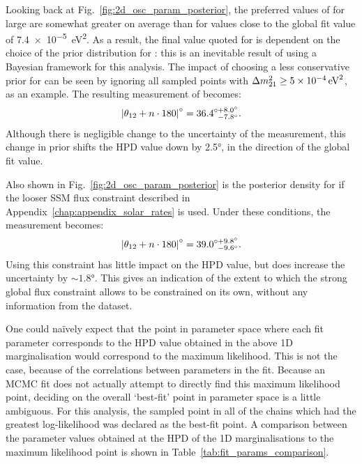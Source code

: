 Looking back at Fig.~\ref{fig:2d_osc_param_posterior}, the preferred values of \tonetwo{} for large \dmsq{} are somewhat greater on average than for \dmsq{} values close to the global fit value of \SI{7.4e-5}{\eV\squared}. As a result, the final value quoted for \tonetwo{} is dependent on the choice of the prior distribution for \dmsq{}: this is an inevitable result of using a Bayesian framework for this analysis. The impact of choosing a less conservative prior for \dmsq{} can be seen by ignoring all sampled points with $\dmsq{} \geq \SI{5e-4}{\eV\squared}$, as an example. The resulting measurement of \tonetwo{} becomes:
\begin{equation*}
    \left|\theta_{12}{} + n\cdot180\right|^{\circ} = 36.4^{\circ+8.0^{\circ}}_{\phantom{\circ}-7.8^{\circ}}.
\end{equation*}
Although there is negligible change to the uncertainty of the measurement, this change in prior shifts the HPD value down by \ang{2.5}, in the direction of the global fit value.

Also shown in Fig.~\ref{fig:2d_osc_param_posterior} is the posterior density for \tonetwo{} if the looser SSM flux constraint described in Appendix~\ref{chap:appendix_solar_rates} is used. Under these conditions, the measurement becomes:
\begin{equation*}
    \left|\theta_{12}{} + n\cdot180\right|^{\circ} = 39.0^{\circ+9.8^{\circ}}_{\phantom{\circ}-9.6^{\circ}}.
\end{equation*}
Using this constraint has little impact on the HPD value, but does increase the uncertainty by $\sim\ang{1.8}$. This gives an indication of the extent to which the strong global flux constraint allows \tonetwo{} to be constrained on its own, without any information from the dataset.

One could na\"{i}vely expect that the point in parameter space where each fit parameter corresponds to the HPD value obtained in the above 1D marginalisation would correspond to the maximum likelihood. This is not the case, because of the correlations between parameters in the fit. Because an MCMC fit does not actually attempt to directly find this maximum likelihood point, deciding on the overall `best-fit' point in parameter space is a little ambiguous. For this analysis, the sampled point in all of the chains which had the greatest log-likelihood was declared as the best-fit point. A comparison between the parameter values obtained at the HPD of the 1D marginalisations to the maximum likelihood point is shown in Table~\ref{tab:fit_params_comparison}.

